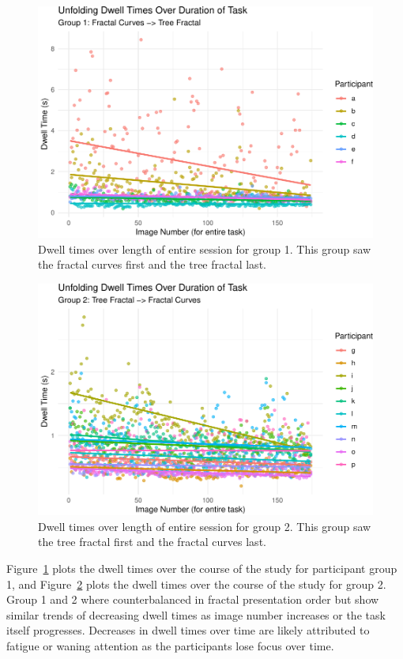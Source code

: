 \documentclass[english,jou]{apa6}
\begin{document}
\begin{figure}
\centering
\includegraphics{paper_papaja_files/figure-latex/fatigue1-1.pdf}
\caption{\label{fig:fatigue1}Dwell times over length of entire session for group 1. This group saw the fractal curves first and the tree fractal last.}
\end{figure}

\begin{figure}
\centering
\includegraphics{paper_papaja_files/figure-latex/fatigue2-1.pdf}
\caption{\label{fig:fatigue2}Dwell times over length of entire session for group 2. This group saw the tree fractal first and the fractal curves last.}
\end{figure}

Figure~\ref{fig:fatigue1} plots the dwell times over the course of the study for participant group 1, and Figure~\ref{fig:fatigue2} plots the dwell times over the course of the study for group 2. Group 1 and 2 where counterbalanced in fractal presentation order but show similar trends of decreasing dwell times as image number increases or the task itself progresses. Decreases in dwell times over time are likely attributed to fatigue or waning attention as the participants lose focus over time.
\end{document}
